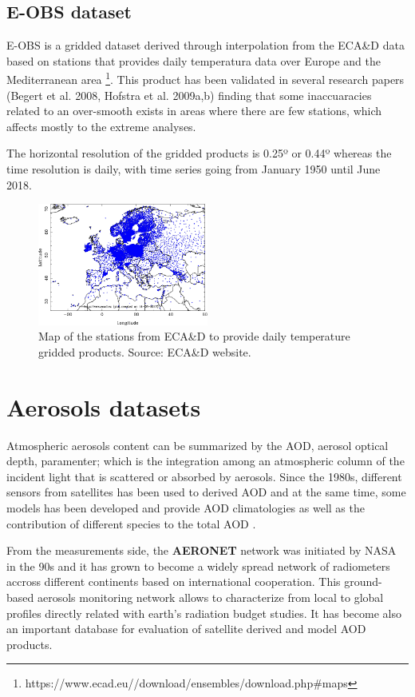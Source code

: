 \subsection{E-OBS dataset}
  
  E-OBS is a gridded dataset derived through interpolation from the ECA\&D data based on stations that provides daily temperatura data over Europe and the Mediterranean area \footnote{https://www.ecad.eu//download/ensembles/download.php#maps}. This product has been validated in several research papers (Begert et al. 2008, Hofstra et al. 2009a,b) finding that some inaccuaracies related to an over-smooth exists in areas where there are few stations, which affects mostly to the extreme analyses.

The horizontal resolution of the gridded products is 0.25º or 0.44º whereas the time resolution is daily, with time series going from January 1950 until June 2018.  


\begin{figure}
\centering
\includegraphics[width=0.5\textwidth]{figs/all_stations_plot.png}
\caption{Map of the stations from ECA\&D to provide daily temperature gridded products. Source: ECA\&D website.}
\label{fig:ecad}
\end{figure}

\section{Aerosols datasets}

Atmospheric aerosols content can be summarized by the AOD, aerosol optical depth, paramenter; which is the integration among an atmospheric column of the incident light that is scattered or absorbed by aerosols. Since the 1980s, different sensors from satellites has been used to derived AOD and at the same time, some models has been developed and provide AOD climatologies as well as the contribution of different species to the total AOD \cite*{Nabat2013}.

From the measurements side, the \textbf{AERONET} network \cite*{Holben1998} was initiated by NASA in the 90s and it has grown to become a widely spread network of radiometers accross different continents based on international cooperation. This ground-based aerosols monitoring network allows to characterize from local to global profiles directly related with earth's radiation budget studies. It has become also an important database for evaluation of satellite derived and model AOD products.

